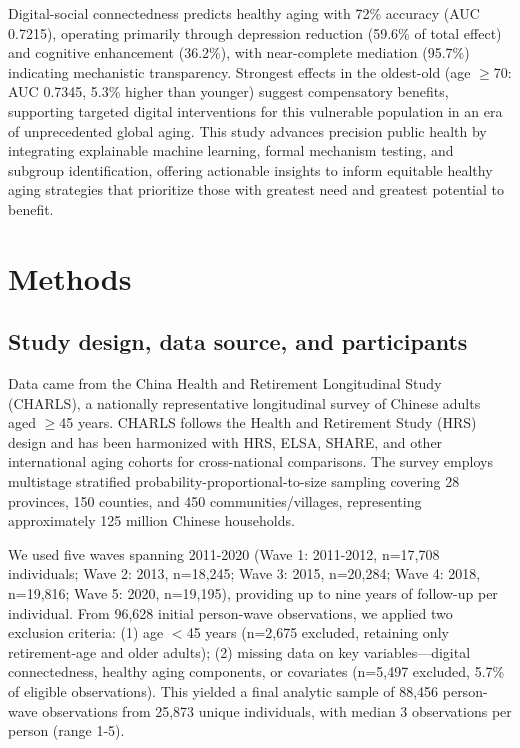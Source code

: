 \documentclass[10pt]{article}
\begin{document}
Digital-social connectedness predicts healthy aging with 72\% accuracy (AUC 0.7215), operating primarily through depression reduction (59.6\% of total effect) and cognitive enhancement (36.2\%), with near-complete mediation (95.7\%) indicating mechanistic transparency. Strongest effects in the oldest-old (age $\geq$70: AUC 0.7345, 5.3\% higher than younger) suggest compensatory benefits, supporting targeted digital interventions for this vulnerable population in an era of unprecedented global aging. This study advances precision public health by integrating explainable machine learning, formal mechanism testing, and subgroup identification, offering actionable insights to inform equitable healthy aging strategies that prioritize those with greatest need and greatest potential to benefit.

\section*{Methods}

\subsection*{Study design, data source, and participants}

Data came from the China Health and Retirement Longitudinal Study (CHARLS), a nationally representative longitudinal survey of Chinese adults aged $\geq$45 years. CHARLS follows the Health and Retirement Study (HRS) design and has been harmonized with HRS, ELSA, SHARE, and other international aging cohorts for cross-national comparisons. The survey employs multistage stratified probability-proportional-to-size sampling covering 28 provinces, 150 counties, and 450 communities/villages, representing approximately 125 million Chinese households.

We used five waves spanning 2011-2020 (Wave 1: 2011-2012, n=17,708 individuals; Wave 2: 2013, n=18,245; Wave 3: 2015, n=20,284; Wave 4: 2018, n=19,816; Wave 5: 2020, n=19,195), providing up to nine years of follow-up per individual. From 96,628 initial person-wave observations, we applied two exclusion criteria: (1) age $<$45 years (n=2,675 excluded, retaining only retirement-age and older adults); (2) missing data on key variables---digital connectedness, healthy aging components, or covariates (n=5,497 excluded, 5.7\% of eligible observations). This yielded a final analytic sample of 88,456 person-wave observations from 25,873 unique individuals, with median 3 observations per person (range 1-5).
\end{document}
